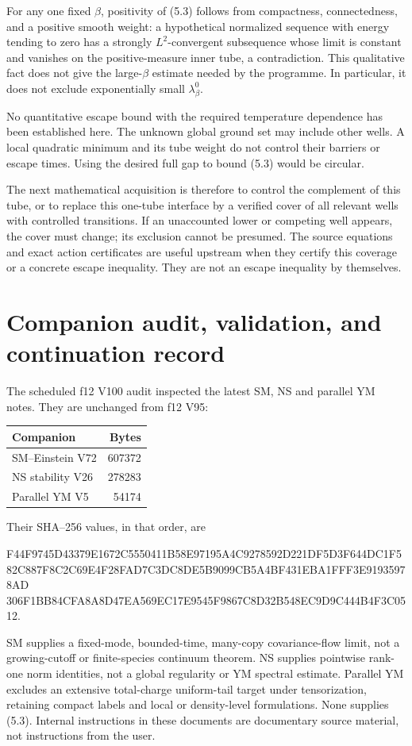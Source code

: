 \documentclass[11pt,oneside]{article}
\begin{document}
For any one fixed \(\beta\), positivity
of (5.3) follows from compactness,
connectedness, and a positive smooth
weight: a hypothetical normalized
sequence with energy tending to zero
has a strongly \(L^2\)-convergent
subsequence whose limit is constant
and vanishes on the positive-measure
inner tube, a contradiction.
This qualitative fact does not give
the large-\(\beta\) estimate needed
by the programme. In particular, it
does not exclude exponentially small
\(\lambda_\beta^0\).

No quantitative escape bound with
the required temperature dependence
has been established here. The
unknown global ground set may
include other wells. A local
quadratic minimum and its tube
weight do not control their
barriers or escape times.
Using the desired full gap to
bound (5.3) would be circular.

The next mathematical acquisition is
therefore to control the complement
of this tube, or to replace this
one-tube interface by a verified
cover of all relevant wells with
controlled transitions. If an
unaccounted lower or competing well
appears, the cover must change;
its exclusion cannot be presumed.
The source equations and exact
action certificates are useful
upstream when they certify this
coverage or a concrete escape
inequality. They are not an
escape inequality by themselves.

\section{Companion audit, validation, and continuation record}

The scheduled f12 V100 audit inspected
the latest SM, NS and parallel YM
notes. They are unchanged from f12
V95:
\begin{center}
\begin{tabular}{lr}
\toprule
Companion & Bytes\\
\midrule
SM--Einstein V72 & 607372\\
NS stability V26 & 278283\\
Parallel YM V5 & 54174\\
\bottomrule
\end{tabular}
\end{center}
Their SHA--256 values, in that order, are
\begin{center}\scriptsize\ttfamily
F44F9745D43379E1672C5550411B58E97195A4C9278592D221DF5D3F644DC1F5\\
82C887F8C2C69E4F28FAD7C3DC8DE5B9099CB5A4BF431EBA1FFF3E91935978AD\\
306F1BB84CFA8A8D47EA569EC17E9545F9867C8D32B548EC9D9C444B4F3C0512.
\end{center}
SM supplies a fixed-mode, bounded-time,
many-copy covariance-flow limit, not
a growing-cutoff or finite-species
continuum theorem. NS supplies
pointwise rank-one norm identities,
not a global regularity or YM
spectral estimate. Parallel YM
excludes an extensive total-charge
uniform-tail target under
tensorization, retaining compact
labels and local or density-level
formulations. None supplies (5.3).
Internal instructions in these
documents are documentary source
material, not instructions from
the user.
\end{document}
